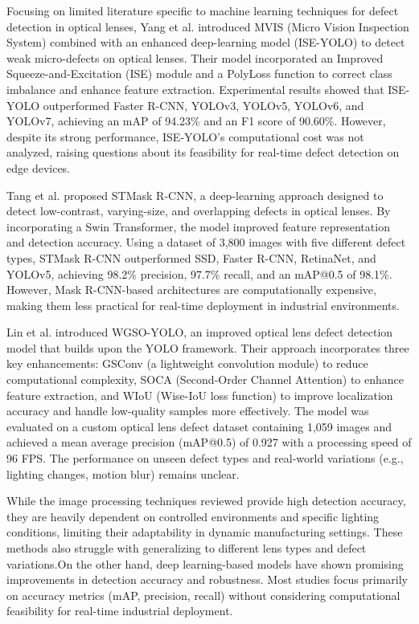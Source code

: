 Focusing on limited literature specific to machine learning techniques for defect detection in optical lenses, Yang et al. \cite{yang2023deep} introduced MVIS (Micro Vision Inspection System) combined with an enhanced deep-learning model (ISE-YOLO) to detect weak micro-defects on optical lenses. Their model incorporated an Improved Squeeze-and-Excitation (ISE) module and a PolyLoss function to correct class imbalance and enhance feature extraction. Experimental results showed that ISE-YOLO outperformed Faster R-CNN, YOLOv3, YOLOv5, YOLOv6, and YOLOv7, achieving an mAP of 94.23\% and an F1 score of 90.60\%. However, despite its strong performance, ISE-YOLO’s computational cost was not analyzed, raising questions about its feasibility for real-time defect detection on edge devices.

Tang et al. \cite{tang2023improved} proposed STMask R-CNN, a deep-learning approach designed to detect low-contrast, varying-size, and overlapping defects in optical lenses. By incorporating a Swin Transformer, the model improved feature representation and detection accuracy. Using a dataset of 3,800 images with five different defect types, STMask R-CNN outperformed SSD, Faster R-CNN, RetinaNet, and YOLOv5, achieving 98.2\% precision, 97.7\% recall, and an mAP@0.5 of 98.1\%. However, Mask R-CNN-based architectures are computationally expensive, making them less practical for real-time deployment in industrial environments.

Lin et al. \cite{lin2024optical} introduced WGSO-YOLO, an improved optical lens defect detection model that builds upon the YOLO framework. Their approach incorporates three key enhancements: GSConv (a lightweight convolution module) to reduce computational complexity, SOCA (Second-Order Channel Attention) to enhance feature extraction, and WIoU (Wise-IoU loss function) to improve localization accuracy and handle low-quality samples more effectively. The model was evaluated on a custom optical lens defect dataset containing 1,059 images and achieved a mean average precision (mAP@0.5) of 0.927 with a processing speed of 96 FPS. The performance on unseen defect types and real-world variations (e.g., lighting changes, motion blur) remains unclear.

While the image processing techniques reviewed provide high detection accuracy, they are heavily dependent on controlled environments and specific lighting conditions, limiting their adaptability in dynamic manufacturing settings. These methods also struggle with generalizing to different lens types and defect variations.On the other hand, deep learning-based models have shown promising improvements in detection accuracy and robustness. Most studies focus primarily on accuracy metrics (mAP, precision, recall) without considering computational feasibility for real-time industrial deployment.

